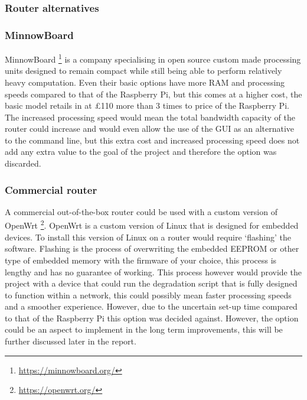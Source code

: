 \subsubsection{Router alternatives}

\subsubsection*{MinnowBoard}
MinnowBoard \footnote{\url{https://minnowboard.org/}} is a company specialising in open source custom made processing units designed to remain compact while still being able to perform relatively heavy computation. Even their basic options have more RAM and processing speeds compared to that of the Raspberry Pi, but this comes at a higher cost, the basic model retails in at £110 more than 3 times to price of the Raspberry Pi. The increased processing speed would mean the total bandwidth capacity of the router could increase and would even allow the use of the GUI as an alternative to the command line, but this extra cost and increased processing speed does not add any extra value to the goal of the project and therefore the option was discarded.

\subsubsection*{Commercial router}
A commercial out-of-the-box router could be used with a custom version of OpenWrt \footnote{\url{https://openwrt.org/}}. OpenWrt is a custom version of Linux that is designed for embedded devices. To install this version of Linux on a router would require `flashing' the software. Flashing is the process of overwriting the embedded EEPROM or other type of embedded memory with the firmware of your choice, this process is lengthy and has no guarantee of working. This process however would provide the project with a device that could run the degradation script that is fully designed to function within a network, this could possibly mean faster processing speeds and a smoother experience. However, due to the uncertain set-up time compared to that of the Raspberry Pi this option was decided against. However, the option could be an aspect to implement in the long term improvements, this will be further discussed later in the report.


